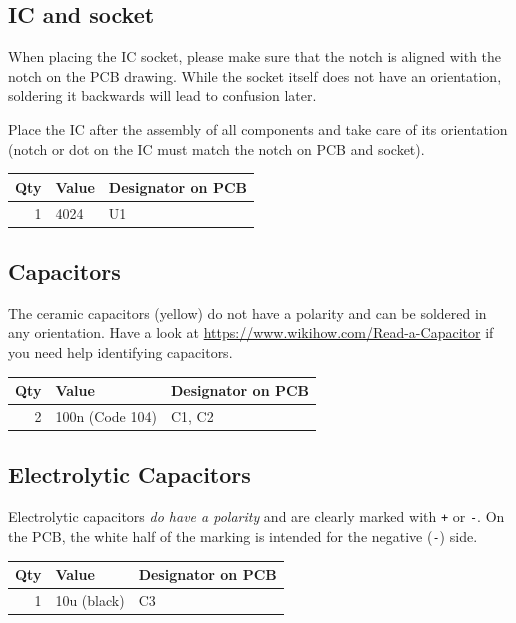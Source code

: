 \documentclass[a4paper,
               11pt,
               parskip=half,
               headinclude,
               titlepage=false]{scrartcl}
\begin{document}
\subsection*{IC and socket}

When placing the IC socket, please make sure that the notch is aligned with the notch on the PCB drawing. While the socket itself does not have an orientation, soldering it backwards will lead to confusion later.

Place the IC after the assembly of all components and take care of its orientation (notch or dot on the IC must match the notch on PCB and socket).

\begin{tabularx}{\textwidth}{| r | l | X |}
\hline
Qty & Value & Designator on PCB \\
\hline
1 &
4024 &
U1 \\
\hline
\end{tabularx}


\subsection*{Capacitors}

The ceramic capacitors (yellow) do not have a polarity and can be soldered in any orientation.
Have a look at \url{https://www.wikihow.com/Read-a-Capacitor} if you need help identifying capacitors.

\begin{tabularx}{\textwidth}{| r | l | X |}
\hline
Qty & Value & Designator on PCB \\
\hline
2 &
100n (Code 104) &
C1, C2 \\
\hline
\end{tabularx}


\subsection*{Electrolytic Capacitors}

Electrolytic capacitors \emph{do have a polarity} and are clearly marked with \texttt{+} or \texttt{-}. On the PCB, the white half of the marking is intended for the negative (\texttt{-}) side.

\begin{tabularx}{\textwidth}{| r | l | X |}
\hline
Qty & Value & Designator on PCB \\
\hline
1 &
10u (black) &
C3 \\
\hline
\end{tabularx}
\end{document}
